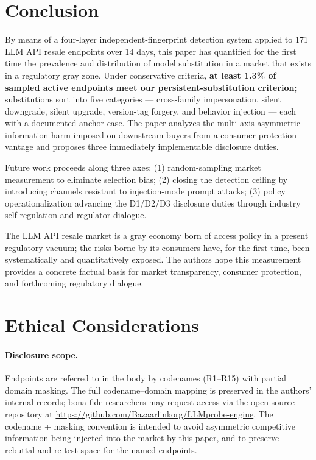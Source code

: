 \documentclass[10pt,a4paper,twocolumn]{article}
\begin{document}
\section{Conclusion}\label{sec:conclusion}

By means of a four-layer independent-fingerprint detection system applied to
171 LLM API resale endpoints over 14 days, this paper has quantified for the
first time the prevalence and distribution of model substitution in a market
that exists in a regulatory gray zone. Under
conservative criteria, \textbf{at least 1.3\% of sampled active endpoints meet our
persistent-substitution criterion}; substitutions sort into five categories
--- cross-family impersonation, silent downgrade, silent upgrade, version-tag
forgery, and behavior injection --- each with a documented anchor case. The
paper analyzes the multi-axis asymmetric-information harm imposed on
downstream buyers from a consumer-protection vantage and proposes three
immediately implementable disclosure duties.

Future work proceeds along three axes: (1) random-sampling market measurement
to eliminate selection bias; (2) closing the detection ceiling by introducing
channels resistant to injection-mode prompt attacks; (3) policy
operationalization advancing the D1/D2/D3 disclosure duties through industry
self-regulation and regulator dialogue.

The LLM API resale market is a gray economy born of access policy in a
present regulatory vacuum; the risks borne by its consumers have, for the
first time, been systematically and quantitatively exposed. The authors hope
this measurement provides a concrete factual basis for market transparency,
consumer protection, and forthcoming regulatory dialogue.




\appendix
\section{Ethical Considerations}\label{app:ethics}

\paragraph{Disclosure scope.}
Endpoints are referred to in the body by codenames (R1--R15) with partial
domain masking. The full codename--domain mapping is preserved in the authors'
internal records; bona-fide researchers may request access via the
open-source repository at
\url{https://github.com/Bazaarlinkorg/LLMprobe-engine}. The codename +
masking convention is intended to avoid asymmetric competitive information
being injected into the market by this paper, and to preserve rebuttal and
re-test space for the named endpoints.
\end{document}
